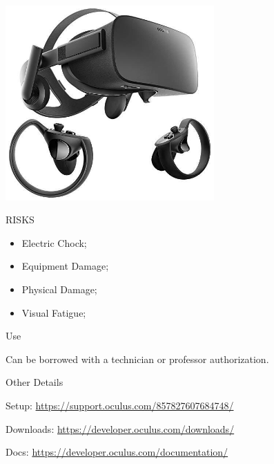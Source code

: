 \begin{multicols}{2}

\includegraphics[width=80mm, keepaspectratio]{imgs/oculus.jpg}

\columnbreak

\begin{mdframed}[roundcorner=10pt, linecolor=red, linewidth=2pt]
\vspace{1em}
{\Large {\color{red}RISKS}}
\vspace{1em}

\begin{itemize}
    \item Electric Chock;
    \item Equipment Damage;
    \item Physical Damage;
    \item Visual Fatigue; 
\end{itemize}

\vspace{1em}
\end{mdframed}

\vspace{2em}

{\Large Use}
\vspace{1em}

Can be borrowed with a technician or professor authorization.
\end{multicols}

{\Large Other Details}
\vspace{1em}

Setup: \url{ https://support.oculus.com/857827607684748/}

Downloads: \url{https://developer.oculus.com/downloads/}

Docs: \url{ https://developer.oculus.com/documentation/}
\newpage



